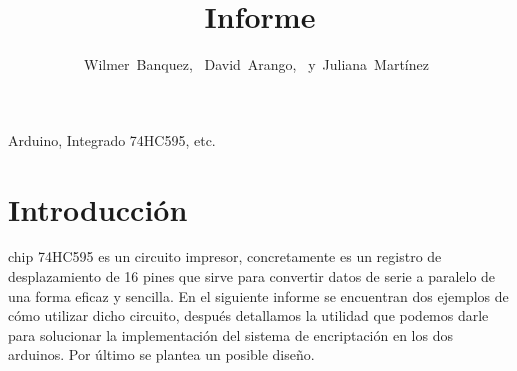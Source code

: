 \documentclass[journal]{IEEEtran}
\begin{document}
\title{Informe}

\author{Wilmer~Banquez,~\IEEEmembership{}
        David~Arango,~\IEEEmembership{}
        y~Juliana~Martínez~\IEEEmembership{}
}


\maketitle


\begin{IEEEkeywords}
Arduino, Integrado 74HC595, etc.
\end{IEEEkeywords}

\section{Introducción}

 chip 74HC595 es un circuito impresor, concretamente es un registro de desplazamiento de 16 pines que sirve para convertir datos de serie a paralelo de una forma eficaz y sencilla. En el siguiente informe se encuentran dos ejemplos de cómo utilizar dicho circuito, después detallamos la utilidad que podemos darle para solucionar la implementación del sistema de encriptación en los dos arduinos. Por último se plantea un posible diseño.\\
\end{document}
